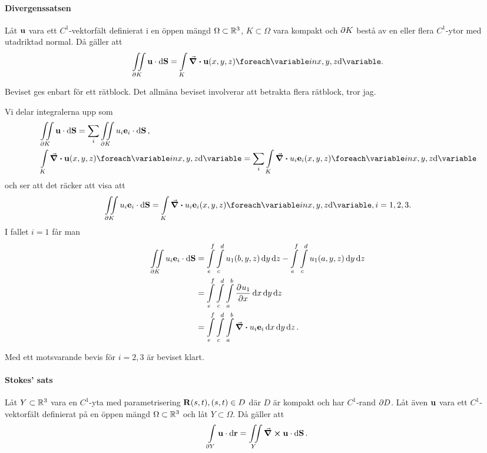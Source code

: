\paragraph{Divergenssatsen}
Låt $\vect{u}$ vara ett $C^1$-vektorfält definierat i en öppen mängd $\Omega\subset\mathbb{R}^3$, $K\subset\Omega$ vara kompakt och $\partial K$ bestå av en eller flera $C^1$-ytor med utadriktad normal. Då gäller att
\begin{align*}
	\fint{\bound{K}}{\vect{u}}{\vect{S}} = \inteval{K}{\div{\vect{u}}}{{x, y, z}}.
\end{align*}

\proof
Beviset ges enbart för ett rätblock. Det allmäna beviset involverar att betrakta flera rätblock, tror jag.

Vi delar integralerna upp som
\begin{align*}
	&\fint{\bound{K}}{\vect{u}}{\vect{S}} = \sum\limits_{i}\fint{\bound{K}}{u_i\vect{e}_i}{\vect{S}}, \\
	&\inteval{K}{\div{\vect{u}}}{{x, y, z}} = \sum\limits_{i}\inteval{K}{\div{u_i\vect{e}_i}}{{x, y, z}}
\end{align*}
och ser att det räcker att visa att
\begin{align*}
	\fint{\bound{K}}{u_i\vect{e}_i}{\vect{S}} = \inteval{K}{\div{u_i\vect{e}_i}}{{x, y, z}}, i = 1, 2, 3.
\end{align*}
I fallet $i = 1$ får man
\begin{align*}
	\fint{\bound{K}}{u_i\vect{e}_i}{\vect{S}} &= \int\limits_{e}^{f}\int\limits_{c}^{d}u_1(b, y, z)\dd{y}\dd{z} - \int\limits_{e}^{f}\int\limits_{c}^{d}u_1(a, y, z)\dd{y}\dd{z} \\
	                                          &= \int\limits_{e}^{f}\int\limits_{c}^{d}\int\limits_{a}^{b}\pdeval{u_1}{x}{x, y, z}\dd{x}\dd{y}\dd{z}\\
	                                          &= \int\limits_{e}^{f}\int\limits_{c}^{d}\int\limits_{a}^{b}\div{u_i\vect{e}_i}\dd{x}\dd{y}\dd{z}.
\end{align*}

Med ett motsvarande bevis för $i = 2, 3$ är beviset klart.

\paragraph{Stokes' sats}
Låt $Y\subset\mathbb{R}^3$ vara en $C^1$-yta med parametrisering $\vect{R}(s, t), (s, t)\in D$ där $D$ är kompakt och har $C^1$-rand $\partial D$. Låt även $\vect{u}$ vara ett $C^1$-vektorfält definierat på en öppen mängd $\Omega\subset\mathbb{R}^3$ och låt $Y\subset\Omega$. Då gäller att
\begin{align*}
	\cint[o]{\bound{Y}}{\vect{u}}{\vect{r}} = \fint{Y}{\curl{\vect{u}}}{\vect{S}}.
\end{align*}

\proof